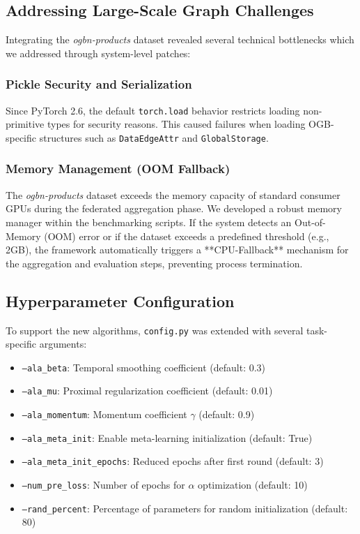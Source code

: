 \documentclass[10pt,conference,compsocconf,letterpaper]{IEEEtran}
\begin{document}
\subsection{Addressing Large-Scale Graph Challenges}
Integrating the \textit{ogbn-products} dataset revealed several technical bottlenecks which we addressed through system-level patches:

\subsubsection{Pickle Security and Serialization}
Since PyTorch 2.6, the default \texttt{torch.load} behavior restricts loading non-primitive types for security reasons. This caused failures when loading OGB-specific structures such as \texttt{DataEdgeAttr} and \texttt{GlobalStorage}.

\subsubsection{Memory Management (OOM Fallback)}
The \textit{ogbn-products} dataset exceeds the memory capacity of standard consumer GPUs during the federated aggregation phase. We developed a robust memory manager within the benchmarking scripts. If the system detects an Out-of-Memory (OOM) error or if the dataset exceeds a predefined threshold (e.g., 2GB), the framework automatically triggers a **CPU-Fallback** mechanism for the aggregation and evaluation steps, preventing process termination.

\subsection{Hyperparameter Configuration}
To support the new algorithms, \texttt{config.py} was extended with several task-specific arguments:
\begin{itemize}
    \item \texttt{--ala\_beta}: Temporal smoothing coefficient (default: 0.3)
    \item \texttt{--ala\_mu}: Proximal regularization coefficient (default: 0.01)
    \item \texttt{--ala\_momentum}: Momentum coefficient $\gamma$ (default: 0.9)
    \item \texttt{--ala\_meta\_init}: Enable meta-learning initialization (default: True)
    \item \texttt{--ala\_meta\_init\_epochs}: Reduced epochs after first round (default: 3)
    \item \texttt{--num\_pre\_loss}: Number of epochs for $\alpha$ optimization (default: 10)
    \item \texttt{--rand\_percent}: Percentage of parameters for random initialization (default: 80)
\end{itemize}
\end{document}
